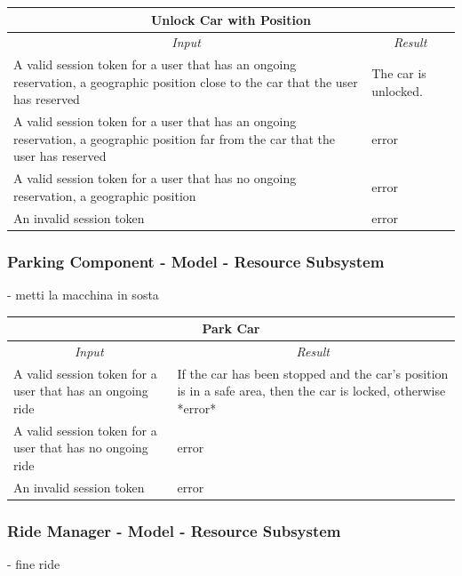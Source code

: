\documentclass[english]{article}
\begin{document}
\begin{center}
	
	\begin{tabular}{ | p{6cm} | p{6cm} | }
		\hline 
		\multicolumn{2}{|c|}{\textbf{Unlock Car with Position}} \\
		\hline
		\multicolumn{1}{|c|}{\textit{Input}} & \multicolumn{1}{c|}{\textit{Result}} \\
		\hline
		A valid session token for a user that has an ongoing reservation, a geographic position close to the car that the user has reserved  & The car is unlocked. \\
		\hline
		A valid session token for a user that has an ongoing reservation, a geographic position far from the car that the user has reserved & error \\
		\hline
		A valid session token for a user that has no ongoing reservation, a geographic position & error \\
		\hline
		An invalid session token & error \\
		\hline
	\end{tabular}
\end{center}

\subsubsection{Parking Component - Model - Resource Subsystem}
- metti la macchina in sosta

\begin{center}

	\begin{tabular}{ | p{6cm} | p{6cm} | }
		\hline 
		\multicolumn{2}{|c|}{\textbf{Park Car}} \\
		\hline
		\multicolumn{1}{|c|}{\textit{Input}} & \multicolumn{1}{c|}{\textit{Result}} \\
		\hline
		A valid session token for a user that has an ongoing ride  & If the car has been stopped and the car's position is in a safe area, then the car is locked, otherwise *error* \\
		\hline
		A valid session token for a user that has no ongoing ride &  error \\
		\hline
		An invalid session token & error \\
		\hline
	\end{tabular}
\end{center}

\subsubsection{Ride Manager - Model - Resource Subsystem}
- fine ride
\end{document}
